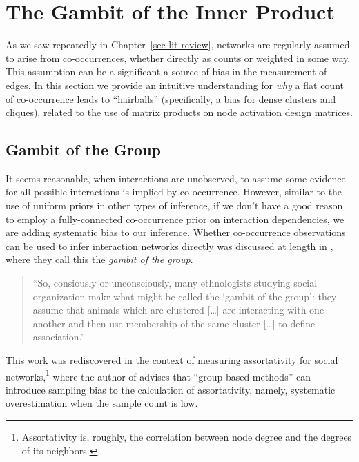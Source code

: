 \documentclass[%
	12pt,
		oneside,
		letterpaper
]{book}
\begin{document}
\section{The Gambit of the Inner Product}\label{sec-clique-bias}

As we saw repeatedly in Chapter~\ref{sec-lit-review}, networks are
regularly assumed to arise from co-occurrences, whether directly as
counts or weighted in some way. This assumption can be a significant a
source of bias in the measurement of edges. In this section we provide
an intuitive understanding for \emph{why} a flat count of co-occurrence
leads to ``hairballs'' (specifically, a bias for dense clusters and
cliques), related to the use of matrix products on node activation
design matrices.

\subsection{Gambit of the Group}\label{gambit-of-the-group}

It seems reasonable, when interactions are unobserved, to assume some
evidence for all possible interactions is implied by co-occurrence.
However, similar to the use of uniform priors in other types of
inference, if we don't have a good reason to employ a fully-connected
co-occurrence prior on interaction dependencies, we are adding
systematic bias to our inference. Whether co-occurrence observations can
be used to infer interaction networks directly was discussed at length
in \textcite{Techniquesanalyzingvertebrate_Whitehead1999}, where they
call this the \emph{gambit of the group}.

\begin{quote}
``So, consiously or unconsciously, many ethnologists studying social
organization makr what might be called the `gambit of the group': they
assume that animals which are clustered {[}\ldots{]} are interacting
with one another and then use membership of the same cluster
{[}\ldots{]} to define association.''

\textcite{Techniquesanalyzingvertebrate_Whitehead1999}
\end{quote}

This work was rediscovered in the context of measuring assortativity for
social networks,\footnote{Assortativity is, roughly, the correlation
  between node degree and the degrees of its neighbors.} where the
author of \textcite{PerceivedAssortativitySocial_Fisher2017} advises
that ``group-based methods'' can introduce sampling bias to the
calculation of assortativity, namely, systematic overestimation when the
sample count is low.
\end{document}
